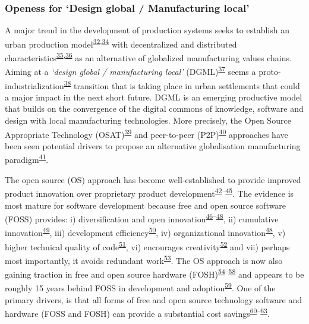 \documentclass[
  12pt,
  a4paperpaper,
  onecolumn]{article}
\begin{document}
\hypertarget{openess-for-design-global-manufacturing-local}{%
\subsubsection{Openess for `Design global / Manufacturing
local'}\label{openess-for-design-global-manufacturing-local}}

A major trend in the development of production systems seeks to
establish an urban production
model\textsuperscript{\protect\hyperlink{ref-Herrmann2020}{32},\protect\hyperlink{ref-juraschek2022}{34}}
with decentralized and distributed
characteristics\textsuperscript{\protect\hyperlink{ref-priavolou2022}{35},\protect\hyperlink{ref-cerdas2017}{36}}
as an alternative of globalized manufacturing values chains. Aiming at a
\emph{`design global / manufacturing local'}
(DGML)\textsuperscript{\protect\hyperlink{ref-Kostakis2018}{37}} seems a
proto-industrialization\textsuperscript{\protect\hyperlink{ref-sabel1985}{38}}
transition that is taking place in urban settlements that could a major
impact in the next short future. DGML is an emerging productive model
that builds on the convergence of the digital commons of knowledge,
software and design with local manufacturing technologies. More
precisely, the Open Source Appropriate Technology
(OSAT)\textsuperscript{\protect\hyperlink{ref-Pearce2010}{39}} and
peer-to-peer
(P2P)\textsuperscript{\protect\hyperlink{ref-Kostakis2013}{40}}
approaches have been seen potential drivers to propose an alternative
globalisation manufacturing
paradigm\textsuperscript{\protect\hyperlink{ref-Heikkinen2020a}{41}}.

The open source (OS) approach has become well-established to provide
improved product innovation over proprietary product
development\textsuperscript{\protect\hyperlink{ref-dibona1999}{42}--\protect\hyperlink{ref-deek2007}{45}}.
The evidence is most mature for software development because free and
open source software (FOSS) provides: i) diversification and open
innovation\textsuperscript{\protect\hyperlink{ref-colombo2014}{46}--\protect\hyperlink{ref-alexy2013}{48}},
ii) cumulative
innovation\textsuperscript{\protect\hyperlink{ref-boudreau2016}{49}},
iii) development
efficiency\textsuperscript{\protect\hyperlink{ref-hienerth2014}{50}},
iv) organizational
innovation\textsuperscript{\protect\hyperlink{ref-alexy2013}{48}}, v)
higher technical quality of
code\textsuperscript{\protect\hyperlink{ref-soderberg2015}{51}}, vi)
encourages
creativity\textsuperscript{\protect\hyperlink{ref-martinez2015}{52}} and
vii) perhaps most importantly, it avoids redundant
work\textsuperscript{\protect\hyperlink{ref-Ardal2016}{53}}. The OS
approach is now also gaining traction in free and open source hardware
(FOSH)\textsuperscript{\protect\hyperlink{ref-thompson2011}{54}--\protect\hyperlink{ref-li2018}{58}}
and appears to be roughly 15 years behind FOSS in development and
adoption\textsuperscript{\protect\hyperlink{ref-pearce2018}{59}}. One of
the primary drivers, is that all forms of free and open source
technology software and hardware (FOSS and FOSH) can provide a
substantial cost
savings\textsuperscript{\protect\hyperlink{ref-petch2014}{60}--\protect\hyperlink{ref-wittbrodt2013}{63}}.
\end{document}
